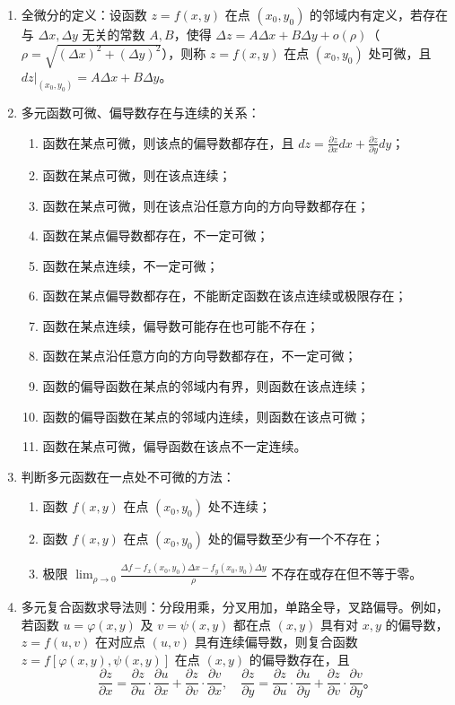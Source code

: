 \documentclass[UTF8]{ctexart}
\theoremstyle{remark}
\begin{document}
\begin{enumerate}
	\item 全微分的定义：设函数 \(z = f(x, y)\) 在点 \((x_0, y_0)\) 的邻域内有定义，若存在与 \(\Delta x, \Delta y\) 无关的常数 \(A, B\)，使得 \(\Delta z = A\Delta x + B\Delta y + o(\rho)\)（\(\rho = \sqrt{(\Delta x)^2 + (\Delta y)^2}\)），则称 \(z = f(x, y)\) 在点 \((x_0, y_0)\) 处可微，且 \(dz|_{(x_0, y_0)} = A\Delta x + B\Delta y\)。
	
	\item 多元函数可微、偏导数存在与连续的关系：
	\begin{enumerate}
		\item 函数在某点可微，则该点的偏导数都存在，且 \(dz = \frac{\partial z}{\partial x}dx + \frac{\partial z}{\partial y}dy\)；
		\item 函数在某点可微，则在该点连续；
		\item 函数在某点可微，则在该点沿任意方向的方向导数都存在；
		\item 函数在某点偏导数都存在，不一定可微；
		\item 函数在某点连续，不一定可微；
		\item 函数在某点偏导数都存在，不能断定函数在该点连续或极限存在；
		\item 函数在某点连续，偏导数可能存在也可能不存在；
		\item 函数在某点沿任意方向的方向导数都存在，不一定可微；
		\item 函数的偏导函数在某点的邻域内有界，则函数在该点连续；
		\item 函数的偏导函数在某点的邻域内连续，则函数在该点可微；
		\item 函数在某点可微，偏导函数在该点不一定连续。
	\end{enumerate}
	
	\item 判断多元函数在一点处不可微的方法：
	\begin{enumerate}
		\item 函数 \(f(x, y)\) 在点 \((x_0, y_0)\) 处不连续；
		\item 函数 \(f(x, y)\) 在点 \((x_0, y_0)\) 处的偏导数至少有一个不存在；
		\item 极限 \(\lim_{\rho \to 0} \frac{\Delta f - f_x(x_0, y_0)\Delta x - f_y(x_0, y_0)\Delta y}{\rho}\) 不存在或存在但不等于零。
	\end{enumerate}
	
	\item 多元复合函数求导法则：分段用乘，分叉用加，单路全导，叉路偏导。例如，若函数 \(u = \varphi(x, y)\) 及 \(v = \psi(x, y)\) 都在点 \((x, y)\) 具有对 \(x, y\) 的偏导数，\(z = f(u, v)\) 在对应点 \((u, v)\) 具有连续偏导数，则复合函数 \(z = f[\varphi(x, y), \psi(x, y)]\) 在点 \((x, y)\) 的偏导数存在，且
	\[
	\frac{\partial z}{\partial x} = \frac{\partial z}{\partial u} \cdot \frac{\partial u}{\partial x} + \frac{\partial z}{\partial v} \cdot \frac{\partial v}{\partial x}, \quad \frac{\partial z}{\partial y} = \frac{\partial z}{\partial u} \cdot \frac{\partial u}{\partial y} + \frac{\partial z}{\partial v} \cdot \frac{\partial v}{\partial y}。
	\]
	

\end{enumerate}
\end{document}
